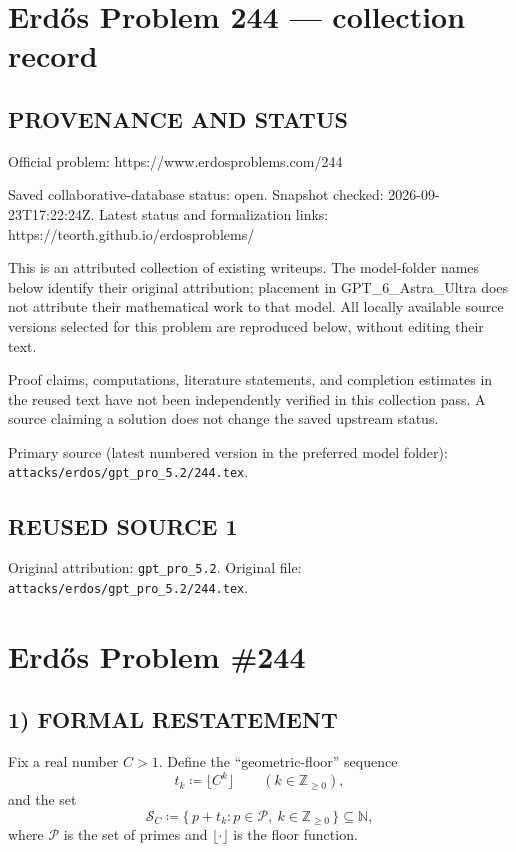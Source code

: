 \section*{Erd\H{o}s Problem 244 --- collection record}

\subsection*{PROVENANCE AND STATUS}
Official problem: https://www.erdosproblems.com/244

Saved collaborative-database status: open.
Snapshot checked: 2026-09-23T17:22:24Z.
Latest status and formalization links: https://teorth.github.io/erdosproblems/

This is an attributed collection of existing writeups. The model-folder names below identify their original attribution; placement in GPT\_6\_Astra\_Ultra does not attribute their mathematical work to that model. All locally available source versions selected for this problem are reproduced below, without editing their text.

Proof claims, computations, literature statements, and completion estimates in the reused text have not been independently verified in this collection pass. A source claiming a solution does not change the saved upstream status.

Primary source (latest numbered version in the preferred model folder): \texttt{attacks/erdos/gpt\_pro\_5.2/244.tex}.

\subsection*{REUSED SOURCE 1}
Original attribution: \texttt{gpt\_pro\_5.2}.
Original file: \texttt{attacks/erdos/gpt\_pro\_5.2/244.tex}.

\section*{Erd\H{o}s Problem \#244}

\subsection*{1) FORMAL RESTATEMENT}
Fix a real number $C>1$. Define the ``geometric-floor'' sequence
\[
 t_k \coloneqq \lfloor C^k\rfloor\qquad (k\in\mathbb{Z}_{\ge 0}),
\]
and the set
\[
\mathcal{S}_C \coloneqq \{\, p + t_k : p\in\mathcal{P},\ k\in\mathbb{Z}_{\ge 0}\,\}\subseteq\mathbb{N},
\]
where $\mathcal{P}$ is the set of primes and $\lfloor\cdot\rfloor$ is the floor function.

